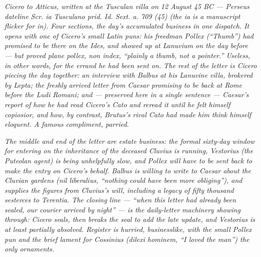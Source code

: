 
\textit{Cicero to Atticus, written at the Tusculan villa on 12
August 45 BC --- Perseus dateline \textit{Scr. ia Tusculano prid.
Id. Sext. a. 709 (45)} (the \textit{ia} is a manuscript flicker
for \textit{in}). Four sections, the day's accumulated business
in one dispatch. It opens with one of Cicero's small Latin puns:
his freedman Pollex (``Thumb'') had promised to be there on the
Ides, and showed up at Lanuvium on the day before --- but proved
\textit{plane pollex, non index}, ``plainly a thumb, not a
pointer.'' Useless, in other words, for the errand he had been
sent on. The rest of the letter is Cicero piecing the day
together: an interview with Balbus at his Lanuvine villa,
brokered by Lepta; the freshly arrived letter from Caesar
promising to be back at Rome before the \textit{Ludi Romani};
and --- preserved here in a single sentence --- Caesar's report
of how he had read Cicero's \textit{Cato} and reread it until he
felt himself \textit{copiosior}, and how, by contrast, Brutus's
rival \textit{Cato} had made him think \textit{himself} eloquent.
A famous compliment, parried.}

\textit{The middle and end of the letter are estate business: the
formal sixty-day window for entering on the inheritance of the
deceased Cluvius is running, Vestorius (the Puteolan agent) is
being unhelpfully slow, and Pollex will have to be sent back to
make the entry on Cicero's behalf. Balbus is willing to write to
Caesar about the Cluvian gardens (\textit{nil liberalius}, ``nothing
could have been more obliging''), and supplies the figures from
Cluvius's will, including a legacy of fifty thousand sesterces to
Terentia. The closing line --- ``when this letter had already been
sealed, our courier arrived by night'' --- is the daily-letter
machinery showing through: Cicero seals, then breaks the seal to
add the late update, and Vestorius is at least partially absolved.
Register is hurried, businesslike, with the small Pollex pun and
the brief lament for Cossinius (\textit{dilexi hominem}, ``I loved
the man'') the only ornaments.}
